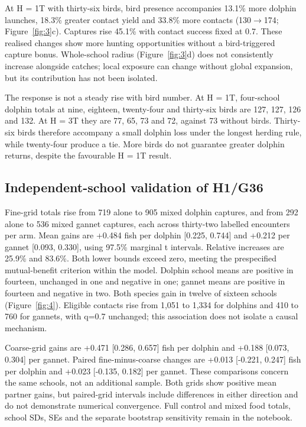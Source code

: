 \documentclass[10pt,a4paper,twocolumn]{article}
\begin{document}
At H = 1T with thirty-six birds, bird presence accompanies 13.1\% more dolphin launches, 18.3\% greater contact yield and 33.8\% more contacts (130\ensuremath{\rightarrow}174; Figure~\ref{fig:3}c). Captures rise 45.1\% with contact success fixed at 0.7. These realised changes show more hunting opportunities without a bird-triggered capture bonus. Whole-school radius (Figure~\ref{fig:3}d) does not consistently increase alongside catches; local exposure can change without global expansion, but its contribution has not been isolated.

The response is not a steady rise with bird number. At H = 1T, four-school dolphin totals at nine, eighteen, twenty-four and thirty-six birds are 127, 127, 126 and 132. At H = 3T they are 77, 65, 73 and 72, against 73 without birds. Thirty-six birds therefore accompany a small dolphin loss under the longest herding rule, while twenty-four produce a tie. More birds do not guarantee greater dolphin returns, despite the favourable H = 1T result.

\subsection{Independent-school validation of H1/G36}
Fine-grid totals rise from 719 alone to 905 mixed dolphin captures, and from 292 alone to 536 mixed gannet captures, each across thirty-two labelled encounters per arm. Mean gains are +0.484 fish per dolphin [0.225, 0.744] and +0.212 per gannet [0.093, 0.330], using 97.5\% marginal t intervals. Relative increases are 25.9\% and 83.6\%. Both lower bounds exceed zero, meeting the prespecified mutual-benefit criterion within the model. Dolphin school means are positive in fourteen, unchanged in one and negative in one; gannet means are positive in fourteen and negative in two. Both species gain in twelve of sixteen schools (Figure~\ref{fig:4}). Eligible contacts rise from 1,051 to 1,334 for dolphins and 410 to 760 for gannets, with q=0.7 unchanged; this association does not isolate a causal mechanism.

Coarse-grid gains are +0.471 [0.286, 0.657] fish per dolphin and +0.188 [0.073, 0.304] per gannet. Paired fine-minus-coarse changes are +0.013 [-0.221, 0.247] fish per dolphin and +0.023 [-0.135, 0.182] per gannet. These comparisons concern the same schools, not an additional sample. Both grids show positive mean partner gains, but paired-grid intervals include differences in either direction and do not demonstrate numerical convergence. Full control and mixed food totals, school SDs, SEs and the separate bootstrap sensitivity remain in the notebook.
\end{document}
